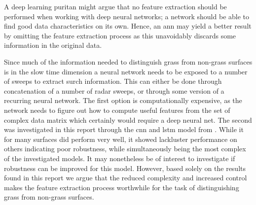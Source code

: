 A deep learning puritan might argue that no feature extraction should be performed when working with deep neural networks; a network should be able to find good data characteristics on its own. Hence, an \gls{ann} may yield a better result by omitting the feature extraction process as this unavoidably discards some information in the original data. 

Since much of the information needed to distinguish grass from non-grass surfaces is in the slow time dimension a neural network needs to be exposed to a number of sweeps to extract surch information. This can either be done through concatenation of a number of radar sweeps, or through some version of a recurring neural network. The first option is computationally expensive, as the network needs to figure out how to compute useful features from the set of complex data matrix which certainly would require a deep neural net. The second was investigated in this report through the \gls{cnn} and \gls{lstm} model from \citep{karim_majumdar_darabi_chen_2018}. While it for many surfaces did perform very well, it showed lackluster performance on others indicating poor robustness, while simultaneously being the most complex of the investigated models. It may nonetheless be of interest to investigate if robustness can be improved for this model. However, based solely on the results found in this report we argue that the reduced complexity and increased control makes the feature extraction process worthwhile for the task of distinguishing grass from non-grass surfaces.  


